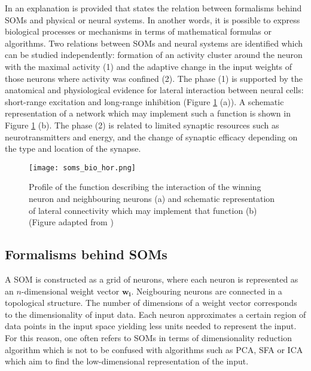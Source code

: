 In \citep{Kohonen} an explanation is provided that states the relation between formalisms behind SOMs and physical or neural systems. In another words, it is possible to express biological processes or mechanisms in terms of mathematical formulas or algorithms. Two relations between SOMs and neural systems are identified which can be studied independently: formation of an activity cluster around the neuron with the maximal activity (1) and the adaptive change in the input weights of those neurons where activity was confined (2). The phase (1) is supported by the anatomical and physiological evidence for lateral interaction between neural cells: short-range excitation and long-range inhibition (Figure \ref{fig:interact} (a)). A schematic representation of a network  which may implement such a function is shown in Figure \ref{fig:interact} (b). The phase (2) is related to limited synaptic resources such as 
neurotransmitters and energy, and the change of synaptic efficacy depending on the type and location of the synapse.



\begin{figure}[t]
\centering
\texttt{[image: soms\_bio\_hor.png]}
\caption[Lateral connectivity around the winning neuron in a SOM]{Profile of the function describing the interaction of the winning neuron and neighbouring neurons (a) and schematic representation of lateral connectivity which may implement that function (b) (Figure adapted from \citep{Kohonen})}
\label{fig:interact}
\end{figure}



\subsection{Formalisms behind SOMs}
\label{sec:sommath}


A SOM is constructed as a grid of neurons, where each neuron is represented as 
an $n$-dimensional weight vector $\mathbf{w_i}$. Neigbouring neurons are 
connected in a topological structure.
The number of dimensions of a weight vector corresponds to the dimensionality of input data. Each neuron approximates a certain region of data points in the input space yielding less units needed to represent the input. For this reason, one often refers to SOMs in terms of dimensionality reduction algorithm which is not to be confused with algorithms such as PCA, SFA or ICA which aim to find the low-dimensional representation of the input.

